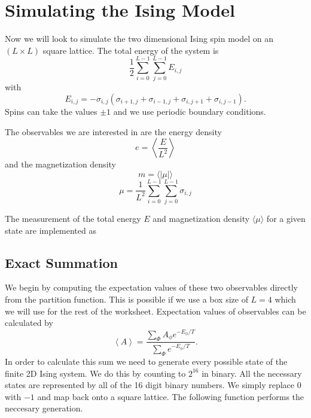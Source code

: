 \section{Simulating the Ising Model}
Now we will look to simulate the two dimensional Ising spin model on an $(L \times L)$ square lattice.	The total energy of the system is 
\begin{equation}
\frac{1}{2}\sum_{i=0}^{L-1}\sum_{j=0}^{L-1}E_{i,j}
\end{equation}
with
\begin{equation}
E_{i,j} = -\sigma_{i,j}(\sigma_{i+1,j} + \sigma_{i-1,j} + \sigma_{i,j+1} + \sigma_{i,j-1}).
\end{equation}
Spins can take the values $\pm 1$ and we use periodic boundary conditions.

The observables we are interested in are the energy density
\begin{equation}
e =\left \langle \frac{E}{L^2}\right\rangle
\end{equation}
and the magnetization density
\begin{equation}
m = \langle |\mu| \rangle
\end{equation}
\begin{equation}
\mu = \frac{1}{L^2} \sum_{i=0}^{L-1}\sum_{j=0}^{L-1}\sigma_{i,j}
\end{equation}

The measurement of the total energy $E$ and magnetization density $\langle\mu\rangle$ for a given state are implemented as
\subsection{Exact Summation}
We begin by computing the expectation values of these two observables directly from the partition function. This is possible if we use a box size of $L=4$ which we will use for the rest of the worksheet. Expectation values of observables can be calculated by
\begin{equation}
\left\langle A \right\rangle = \frac{\sum_\Phi A_\phi e^{-E_\phi /T}}{\sum_\Phi e^{-E_\phi /T}}.
\label{eq:part}
\end{equation}
In order to calculate this sum we need to generate every possible state of the finite 2D Ising system. We do this by counting to $2^{16}$ in binary. All the necessary states are represented by all of the 16 digit binary numbers. We simply replace $0$ with $-1$ and map back onto a square lattice. The following function performs the neccesary generation.

